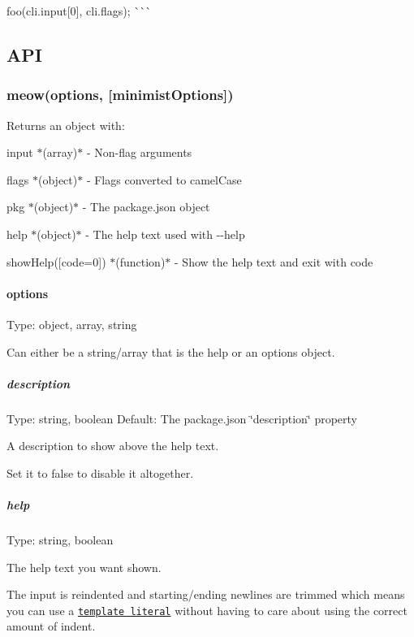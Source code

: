 foo(cli.\+input\mbox{[}0\mbox{]}, cli.\+flags); \`{}\`{}\`{}

\subsection*{A\+PI}

\subsubsection*{meow(options, \mbox{[}minimist\+Options\mbox{]})}

Returns an object with\+:


\begin{DoxyItemize}
\item {\ttfamily input} $\ast$(array)$\ast$ -\/ Non-\/flag arguments
\item {\ttfamily flags} $\ast$(object)$\ast$ -\/ Flags converted to camel\+Case
\item {\ttfamily pkg} $\ast$(object)$\ast$ -\/ The {\ttfamily package.\+json} object
\item {\ttfamily help} $\ast$(object)$\ast$ -\/ The help text used with {\ttfamily -\/-\/help}
\item {\ttfamily show\+Help(\mbox{[}code=0\mbox{]})} $\ast$(function)$\ast$ -\/ Show the help text and exit with {\ttfamily code}
\end{DoxyItemize}

\paragraph*{options}

Type\+: {\ttfamily object}, {\ttfamily array}, {\ttfamily string}

Can either be a string/array that is the {\ttfamily help} or an options object.

\subparagraph*{description}

Type\+: {\ttfamily string}, {\ttfamily boolean} Default\+: The package.\+json {\ttfamily \char`\"{}description\char`\"{}} property

A description to show above the help text.

Set it to {\ttfamily false} to disable it altogether.

\subparagraph*{help}

Type\+: {\ttfamily string}, {\ttfamily boolean}

The help text you want shown.

The input is reindented and starting/ending newlines are trimmed which means you can use a \href{https://developer.mozilla.org/en/docs/Web/JavaScript/Reference/template_strings}{\tt template literal} without having to care about using the correct amount of indent.

